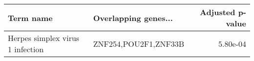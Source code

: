 \begin{tabular}{llr}
\toprule
                       Term name & Overlapping genes... &  Adjusted p-value \\
\midrule
Herpes simplex virus 1 infection & ZNF254,POU2F1,ZNF33B &          5.80e-04 \\
\bottomrule
\end{tabular}
